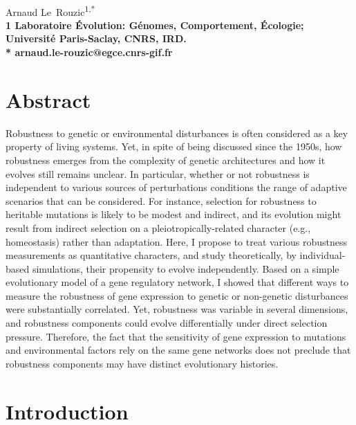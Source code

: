 \documentclass[10pt,a4paper]{article}
\title{}
\date{}
\begin{document}
\vspace*{0.35in}

\begin{flushleft}
{\Large
\textbf{}
}
\newline
\\
Arnaud Le~Rouzic\textsuperscript{1,*}
\\
\bigskip
\bf{1} Laboratoire Évolution: Génomes, Comportement, Écologie; Université Paris-Saclay, CNRS, IRD.
\\
\bigskip
* arnaud.le-rouzic@egce.cnrs-gif.fr

\end{flushleft}

\section*{Abstract}

Robustness to genetic or environmental disturbances is often considered as a key property of living systems. Yet, in spite of being discussed since the 1950s, how robustness emerges from the complexity of genetic architectures and how it evolves still remains unclear. In particular, whether or not robustness is independent to various sources of perturbations conditions the range of adaptive scenarios that can be considered. For instance, selection for robustness to heritable mutations is likely to be modest and indirect, and its evolution might result from indirect selection on a pleiotropically-related character (e.g., homeostasis) rather than adaptation. Here, I propose to treat various robustness measurements as quantitative characters, and study theoretically, by individual-based simulations, their propensity to evolve independently. Based on a simple evolutionary model of a gene regulatory network, I showed that different ways to measure the robustness of gene expression to genetic or non-genetic disturbances were substantially correlated. Yet, robustness was variable in several dimensions, and  robustness components could evolve differentially under direct selection pressure. Therefore, the fact that the sensitivity of gene expression to mutations and environmental factors rely on the same gene networks does not preclude that robustness components may have distinct evolutionary histories. 


\section{Introduction}
\end{document}
